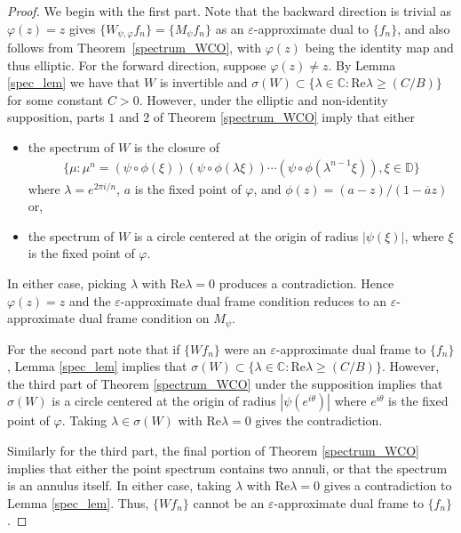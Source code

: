 \documentclass{amsart}
\theoremstyle{definition}
\theoremstyle{remark}
\numberwithin{equation}{section}
\begin{document}
\begin{proof}
    We begin with the first part. Note that the backward direction is trivial as $\varphi(z)=z$ gives $\{W_{\psi, \varphi} f_n\}= \{M_{\psi}f_n\}$ as an $\varepsilon$-approximate dual to $\{f_n\}$, and also follows from Theorem~\ref{spectrum_WCO}, with $\varphi(z)$ being the identity map and thus elliptic. 
    For the forward direction, suppose $\varphi(z)\neq z$. By Lemma \ref{spec_lem} we have that $W$ is invertible and $\sigma(W)\subset\{\lambda \in \mathbb{C}: \text{Re}\lambda\geq (C/B)\}$ for some constant $C>0$. However, under the elliptic and non-identity supposition, parts $1$ and $2$ of Theorem \ref{spectrum_WCO} imply that either 
    \begin{itemize}
        \item[(a)] the spectrum of $W$ is the closure of 
        \begin{align*}
            \{\mu:\mu^{n}=(\psi\circ\phi(\xi))(\psi\circ\phi(\lambda\xi))\cdots(\psi\circ\phi(\lambda^{n-1}\xi)),\xi\in\mathbb{D}\}
        \end{align*}
        where $\lambda=e^{2\pi i/n}$, $a$ is the fixed point of $\varphi$, and $\phi(z)=(a-z)/(1-\overline{a}z)$ or,
        \item[(b)] the spectrum of $W$ is a circle centered at the origin of radius $|\psi(\xi)|$, where $\xi$ is the fixed point of $\varphi$.
    \end{itemize}
    In either case, picking $\lambda$ with $\text{Re}\lambda=0$ produces a contradiction. Hence $\varphi(z)=z$ and the $\varepsilon$-approximate dual frame condition reduces to an $\varepsilon$-approximate dual frame condition on $M_{\psi}$. 
    
    For the second part note that if $\{Wf_{n}\}$ were an $\varepsilon$-approximate dual frame to $\{f_{n}\}$, Lemma \ref{spec_lem} implies that $\sigma(W)\subset\{\lambda \in \mathbb{C}: \text{Re}\lambda\geq (C/B)\}$. However, the third part of Theorem \ref{spectrum_WCO} under the supposition implies that $\sigma(W)$ is a circle centered at the origin of radius $|\psi(e^{i\theta})|$ where $e^{i\theta}$ is the fixed point of $\varphi$. Taking $\lambda\in\sigma(W)$ with $\text{Re}\lambda=0$ gives the contradiction. 

    Similarly for the third part, the final portion of Theorem \ref{spectrum_WCO} implies that either the point spectrum contains two annuli, or that the spectrum is an annulus itself. In either case, taking $\lambda$ with $\text{Re}\lambda=0$ gives a contradiction to Lemma \ref{spec_lem}. Thus, $\{Wf_{n}\}$ cannot be an $\varepsilon$-approximate dual frame to $\{f_{n}\}$. 
\end{proof}
\end{document}
